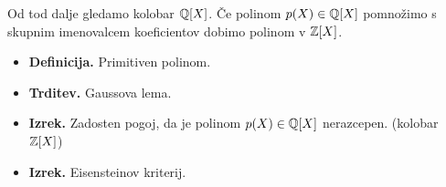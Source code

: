 \begin{enumerate}
    Od tod dalje gledamo kolobar \(\mathbb{Q}[X]\). Če polinom \(p(X) \in \mathbb{Q}[X]\) pomnožimo s skupnim imenovalcem koeficientov dobimo polinom v \(\mathbb{Z}[X]\).
    \begin{itemize}
        \item \textbf{Definicija.} Primitiven polinom.
        \item \textbf{Trditev.} Gaussova lema.
        \item \textbf{Izrek.} Zadosten pogoj, da je polinom \(p(X) \in \mathbb{Q}[X]\) nerazcepen. (kolobar \(\mathbb{Z}[X]\))
        \item \textbf{Izrek.} Eisensteinov kriterij.
    \end{itemize}
\end{enumerate}